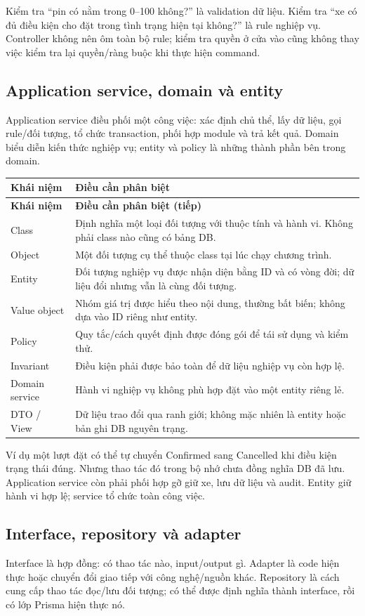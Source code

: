 \documentclass[12pt,a4paper]{article}
\newenvironment{PairTable}[2]{%
  \begin{longtable}{|L{39mm}|L{106mm}|}\hline
  \textbf{#1} & \textbf{#2}\\\hline\endfirsthead
  \hline\textbf{#1} & \textbf{#2 (tiếp)}\\\hline\endhead
}{\end{longtable}}
\begin{document}
Kiểm tra ``pin có nằm trong 0--100 không?'' là validation dữ liệu. Kiểm tra ``xe có đủ điều kiện cho đặt trong tình trạng hiện tại không?'' là rule nghiệp vụ. Controller không nên ôm toàn bộ rule; kiểm tra quyền ở cửa vào cũng không thay việc kiểm tra lại quyền/ràng buộc khi thực hiện command.

\subsection{Application service, domain và entity}
Application service điều phối một công việc: xác định chủ thể, lấy dữ liệu, gọi rule/đối tượng, tổ chức transaction, phối hợp module và trả kết quả. Domain biểu diễn kiến thức nghiệp vụ; entity và policy là những thành phần bên trong domain.

\begin{PairTable}{Khái niệm}{Điều cần phân biệt}
Class & Định nghĩa một loại đối tượng với thuộc tính và hành vi. Không phải class nào cũng có bảng DB.\\\hline
Object & Một đối tượng cụ thể thuộc class tại lúc chạy chương trình.\\\hline
Entity & Đối tượng nghiệp vụ được nhận diện bằng ID và có vòng đời; dữ liệu đổi nhưng vẫn là cùng đối tượng.\\\hline
Value object & Nhóm giá trị được hiểu theo nội dung, thường bất biến; không dựa vào ID riêng như entity.\\\hline
Policy & Quy tắc/cách quyết định được đóng gói để tái sử dụng và kiểm thử.\\\hline
Invariant & Điều kiện phải được bảo toàn để dữ liệu nghiệp vụ còn hợp lệ.\\\hline
Domain service & Hành vi nghiệp vụ không phù hợp đặt vào một entity riêng lẻ.\\\hline
DTO / View & Dữ liệu trao đổi qua ranh giới; không mặc nhiên là entity hoặc bản ghi DB nguyên trạng.\\\hline
\end{PairTable}

Ví dụ một lượt đặt có thể tự chuyển Confirmed sang Cancelled khi điều kiện trạng thái đúng. Nhưng thao tác đó trong bộ nhớ chưa đồng nghĩa DB đã lưu. Application service còn phải phối hợp gỡ giữ xe, lưu dữ liệu và audit. Entity giữ hành vi hợp lệ; service tổ chức toàn công việc.

\subsection{Interface, repository và adapter}
Interface là hợp đồng: có thao tác nào, input/output gì. Adapter là code hiện thực hoặc chuyển đổi giao tiếp với công nghệ/nguồn khác. Repository là cách cung cấp thao tác đọc/lưu đối tượng; có thể được định nghĩa thành interface, rồi có lớp Prisma hiện thực nó.
\end{document}
